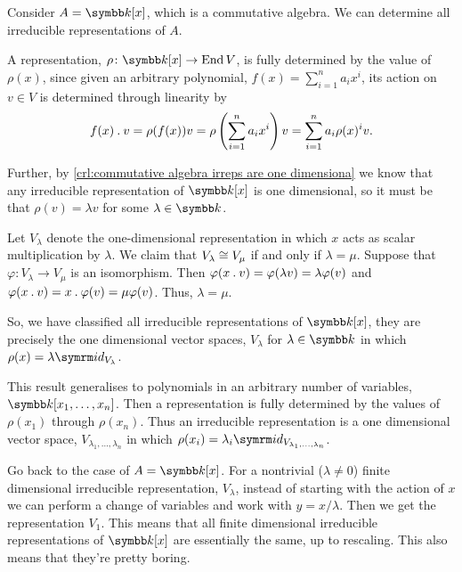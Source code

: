 \begin{exm}{}{}
    Consider \(A = \field[x]\), which is a commutative algebra.
    We can determine all irreducible representations of \(A\).
    
    A representation, \(\rho \colon \field[x] \to \End V\), is fully determined by the value of \(\rho(x)\), since given an arbitrary polynomial, \(f(x) = \sum_{i=1}^{n} a_i x^i\), its action on \(v \in V\) is determined through linearity by
    \begin{equation}
        f(x) \mathbin{.} v = \rho(f(x)) v = \rho\left( \sum_{i=1}^{n} a_i x^i \right) v = \sum_{i=1}^n a_i \rho(x)^i v.
    \end{equation}
    
    Further, by \cref{crl:commutative algebra irreps are one dimensiona} we know that any irreducible representation of \(\field[x]\) is one dimensional, so it must be that \(\rho(v) = \lambda v\) for some \(\lambda \in \field\).
    
    Let \(V_\lambda\) denote the one-dimensional representation in 
    which \(x\) acts as scalar multiplication by \(\lambda\).
    We claim that \(V_\lambda \cong V_{\mu}\) if and only if \(\lambda = \mu\).
    Suppose that \(\varphi \colon V_\lambda \to V_\mu\) is an isomorphism.
    Then \(\varphi(x \mathbin{.} v) = \varphi(\lambda v) = \lambda \varphi(v)\) and \(\varphi(x \mathbin{.} v) = x \mathbin{.} \varphi(v) = \mu \varphi(v)\).
    Thus, \(\lambda = \mu\).
    
    So, we have classified all irreducible representations of \(\field[x]\), they are precisely the one dimensional vector spaces, \(V_\lambda\) for \(\lambda \in \field\) in which \(\rho(x) = \lambda \id_{V_\lambda}\).
    
    This result generalises to polynomials in an arbitrary number of variables, \(\field[x_1, \dotsc, x_n]\).
    Then a representation is fully determined by the values of \(\rho(x_1)\) through \(\rho(x_n)\).
    Thus an irreducible representation is a one dimensional vector space, \(V_{\lambda_1, \dotsc, \lambda_n}\) in which \(\rho(x_i) = \lambda_i \id_{V_{\lambda_1, \dotsc, \lambda_n}}\).
    
    Go back to the case of \(A = \field[x]\).
    For a nontrivial (\(\lambda \ne 0\)) finite dimensional irreducible representation, \(V_\lambda\), instead of starting with the action of \(x\) we can perform a change of variables and work with \(y = x/\lambda\).
    Then we get the representation \(V_1\).
    This means that all finite dimensional irreducible representations of \(\field[x]\) are essentially the same, up to rescaling.
    This also means that they're pretty boring.
    

\end{exm}
